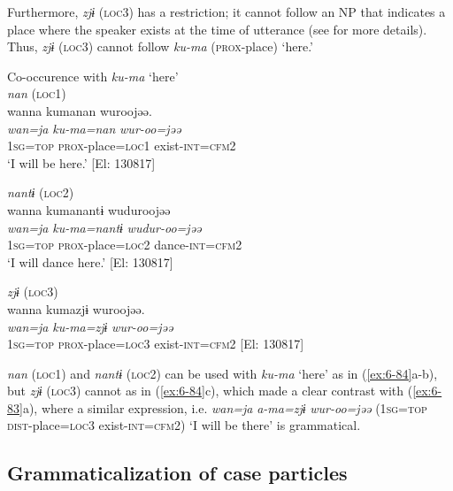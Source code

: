   Furthermore, \textit{zjɨ} (\textsc{loc3}) has a restriction; it cannot follow an NP that indicates a place where the speaker exists at the time of utterance (see  for more details). Thus, \textit{zjɨ} (\textsc{loc3}) cannot follow \textit{ku-ma} (\textsc{prox}-place) ‘here.’

\ea\label{ex:6-84}
 Co-occurence with \textit{ku-ma} ‘here’\\

 \ea \textit{nan} (\textsc{loc1})\\
{\TM}
\glll  wanna  kumanan  wuroojəə.\\
\textit{wan=ja}  \textit{ku-ma=nan}  \textit{wur-oo=jəə}\\
1\textsc{sg}=\textsc{top}  \textsc{prox}-place=\textsc{loc1}  exist-\textsc{int}=\textsc{cfm}2\\
\glt ‘I will be here.’ [El: 130817]

\ex \textit{nantɨ} (\textsc{loc2})\\
{\TM}
\glll  wanna  kumanantɨ  wuduroojəə\\
\textit{wan=ja}  \textit{ku-ma=nantɨ}  \textit{wudur-oo=jəə}\\
1\textsc{sg}=\textsc{top}  \textsc{prox}-place=\textsc{loc2}  dance-\textsc{int}=\textsc{cfm}2\\
\glt ‘I will dance here.’ [El: 130817]

\ex \textit{zjɨ} (\textsc{loc3})\\
{\TM}
\glll  *wanna  kumazjɨ  wuroojəə.\\
\textit{wan=ja}  \textit{ku-ma=zjɨ}  \textit{wur-oo=jəə}\\
1\textsc{sg}=\textsc{top}  \textsc{prox}-place=\textsc{loc3}  exist-\textsc{int}=\textsc{cfm}2      [El: 130817]
\z
\z

\textit{nan} (\textsc{loc1}) and \textit{nantɨ} (\textsc{loc2}) can be used with \textit{ku-ma} ‘here’ as in (\ref{ex:6-84}a-b), but \textit{zjɨ} (\textsc{loc3}) cannot as in (\ref{ex:6-84}c), which made a clear contrast with (\ref{ex:6-83}a), where a similar expression, i.e. \textit{wan=ja} \textit{a-ma=zjɨ} \textit{wur-oo=jəə} (1\textsc{sg}=\textsc{top} \textsc{dist}-place=\textsc{loc3} exist-\textsc{int}=\textsc{cfm}2) ‘I will be there’ is grammatical.

\subsection{Grammaticalization of case particles}

